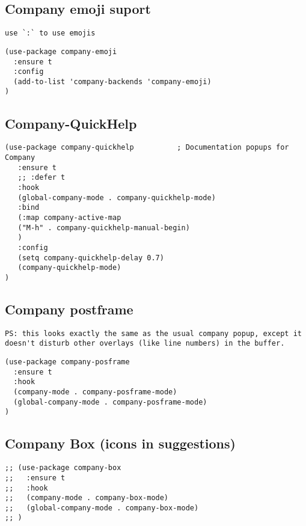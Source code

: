 \documentclass[11pt]{article}
\begin{document}
\subsection*{Company emoji suport}
\label{sec:org4b5f736}

\begin{verbatim}
use `:` to use emojis
\end{verbatim}

\begin{verbatim}
(use-package company-emoji
  :ensure t
  :config
  (add-to-list 'company-backends 'company-emoji)
)
\end{verbatim}

\subsection*{Company-QuickHelp}
\label{sec:org8f34c88}
\begin{verbatim}
(use-package company-quickhelp          ; Documentation popups for Company
   :ensure t
   ;; :defer t
   :hook
   (global-company-mode . company-quickhelp-mode)
   :bind
   (:map company-active-map
   ("M-h" . company-quickhelp-manual-begin)
   )
   :config
   (setq company-quickhelp-delay 0.7)
   (company-quickhelp-mode)
)
\end{verbatim}

\subsection*{Company postframe}
\label{sec:orge30578b}

\begin{verbatim}
PS: this looks exactly the same as the usual company popup, except it doesn't disturb other overlays (like line numbers) in the buffer.
\end{verbatim}

\begin{verbatim}
(use-package company-posframe
  :ensure t
  :hook
  (company-mode . company-posframe-mode)
  (global-company-mode . company-posframe-mode)
)
\end{verbatim}

\subsection*{Company Box (icons in suggestions)}
\label{sec:org67d0b30}
\begin{verbatim}
;; (use-package company-box
;;   :ensure t
;;   :hook
;;   (company-mode . company-box-mode)
;;   (global-company-mode . company-box-mode)
;; )
\end{verbatim}
\end{document}
